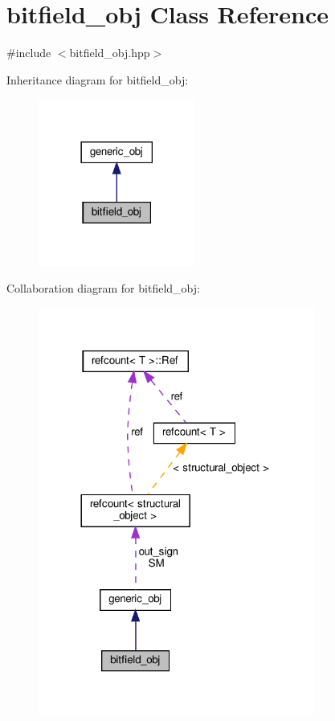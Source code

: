 \hypertarget{classbitfield__obj}{}\section{bitfield\+\_\+obj Class Reference}
\label{classbitfield__obj}


{\ttfamily \#include $<$bitfield\+\_\+obj.\+hpp$>$}



Inheritance diagram for bitfield\+\_\+obj\+:
\nopagebreak
\begin{figure}[H]
\begin{center}
\leavevmode
\includegraphics[width=146pt]{db/dd3/classbitfield__obj__inherit__graph}
\end{center}
\end{figure}


Collaboration diagram for bitfield\+\_\+obj\+:
\nopagebreak
\begin{figure}[H]
\begin{center}
\leavevmode
\includegraphics[width=257pt]{d7/d89/classbitfield__obj__coll__graph}
\end{center}
\end{figure}
